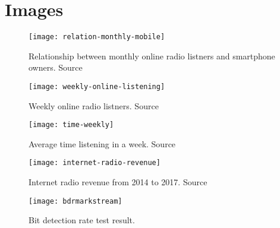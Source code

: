 \section{Images}
\begin{figure}[h]
	\centering
\texttt{[image: relation-monthly-mobile]}
 	\caption{Relationship between monthly online radio listners and smartphone owners. Source \cite{edisonslide}}
 	\label{fig:MonthlyMobile}
\end{figure}
\begin{figure}[h]
	\centering
\texttt{[image: weekly-online-listening]}
 	\caption{Weekly online radio listners. Source \cite{edisonslide}}
 	\label{fig:WeeklyListeners}
\end{figure}
\begin{figure}[h]
	\centering
\texttt{[image: time-weekly]}
 	\caption{Average time listening in a week. Source \cite{edisonslide}}
 	\label{fig:TimeWeekly}
\end{figure}
\begin{figure}[h]
	\centering
\texttt{[image: internet-radio-revenue]}
 	\caption{Internet radio revenue from 2014 to 2017. Source \cite{edisonslide}}
 	\label{fig:InternetRadioRevenue}
\end{figure}
\begin{figure}[h]
	\centering
\texttt{[image: bdrmarkstream]}
 	\caption{Bit detection rate test result.}
 	\label{fig:BDRMarkstream}
\end{figure}